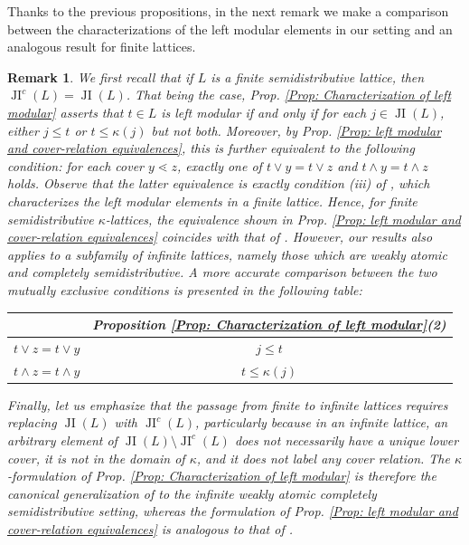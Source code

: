 \documentclass{amsart}
\theoremstyle{thmstyle}
\theoremstyle{exstyle}
\theoremstyle{defstyle}
\theoremstyle{remstyle}
\newtheorem{remark}[thm]{Remark}
\theoremstyle{remstyle}
\DeclareMathOperator*{\JI}{JI}
\begin{document}
Thanks to the previous propositions, in the next remark we make a comparison between the characterizations of the left modular elements in our setting and an analogous result for finite lattices.

\begin{remark}\label{Rem: comparison with LS}
We first recall that if $L$ is a finite semidistributive lattice, then $\JI^c(L) = \JI(L)$. 
That being the case, Prop. \ref{Prop: Characterization of left modular} asserts that $t \in L$ is left modular if and only if for each $j \in \JI(L)$, either $j \leq t$ or $t \leq \kappa(j)$ but not both. 
Moreover, by Prop. \ref{Prop: left modular and cover-relation equivalences}, this is further equivalent to the following condition: for each cover $y \lessdot z$, exactly one of 
$t \vee y = t \vee z$ and $t \wedge y = t \wedge z$ holds. Observe that the latter equivalence is exactly condition (iii) of \cite[Theorem~1.4]{LS}, which characterizes the left modular elements in a finite lattice. 
Hence, for finite semidistributive $\kappa$-lattices, the equivalence shown in Prop. \ref{Prop: left modular and cover-relation equivalences} coincides with that of \cite[Theorem~1.4]{LS}. 
However, our results also applies to a subfamily of infinite lattices, namely those which are weakly atomic and completely semidistributive. 
A more accurate comparison between the two mutually exclusive conditions is presented in the following table:
\begin{center}
\begin{tabular}{c|c}
    \emph{\cite[Theorem 1.4(iii)]{LS}} & \emph{Proposition \ref{Prop: Characterization of left modular}(2)} \\
    \hline 
    $t \vee z = t \vee y$ & $j \leq t$ \\
    $t \wedge z = t \wedge y$ & $t \leq \kappa(j)$ \\
\end{tabular}
\end{center}

Finally, let us emphasize that the passage from finite to infinite lattices requires replacing $\JI(L)$ with $\JI^c(L)$, particularly because in an infinite lattice, an arbitrary element of $\JI(L) \setminus \JI^c(L)$ does not necessarily have a unique lower cover, it is not in the domain of $\kappa$, and it does not label any cover relation. 
The $\kappa$-formulation of Prop. \ref{Prop: Characterization of left modular} is therefore the canonical 
generalization of \cite[Theorem~1.4(iii)]{LS} to the infinite weakly atomic 
completely semidistributive setting, whereas the formulation of Prop. \ref{Prop: left modular and cover-relation equivalences} is analogous to that of \cite[Theorem~1.4(iii)]{LS}.
\end{remark}
\end{document}
